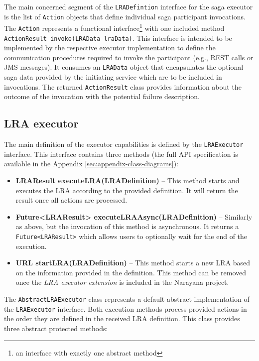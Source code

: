 \documentclass[oneside,
  digital, %
  table,   %
  lof,     %
  lot,     %
]{fithesis3}
\begin{document}
The main concerned segment of the \texttt{LRADefintion} interface for the saga executor is the list of \texttt{Action} objects that define individual saga participant invocations. The \texttt{Action} represents a functional interface\footnote{an interface with exactly one abstract method} with one included method \texttt{ActionResult invoke(LRAData lraData)}. This interface is intended to be implemented by the respective executor implementation to define the communication procedures required to invoke the participant (e.g., REST calls or JMS messages). It consumes an \texttt{LRAData} object that encapsulates the optional saga data provided by the initiating service which are to be included in invocations. The returned \texttt{ActionResult} class provides information about the outcome of the invocation with the potential failure description.

\subsection{LRA executor}

The main definition of the executor capabilities is defined by the \texttt{LRAExecutor} interface. This interface contains three methods (the full API specification is available in the Appendix \ref{sec:appendix-class-diagrams}):

\begin{itemize}
    \item \textbf{LRAResult executeLRA(LRADefinition)} -- This method starts and executes the LRA according to the provided definition. It will return the result once all actions are processed.
    
    \item \textbf{Future<LRAResult> executeLRAAsync(LRADefinition)} -- Similarly as above, but the invocation of this method is asynchronous. It returns a \texttt{Future<LRAResult>} which allows users to optionally wait for the end of the execution.
    
    \item \textbf{URL startLRA(LRADefinition)} -- This method starts a new LRA based on the information provided in the definition. This method can be removed once the \textit{LRA executor extension} is included in the Narayana project.
\end{itemize}

The \texttt{AbstractLRAExecutor} class represents a default abstract implementation of the \texttt{LRAExecutor} interface. Both execution methods process provided actions in the order they are defined in the received LRA definition. This class provides three abstract protected methods:
\end{document}
